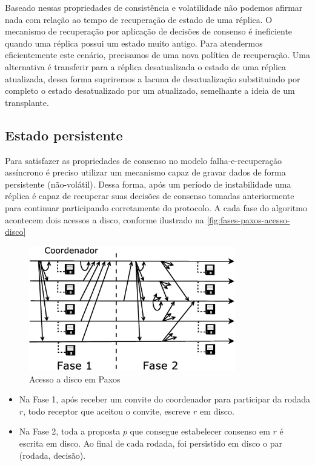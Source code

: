 Baseado nessas propriedades de consistência e volatilidade não podemos afirmar nada com
relação ao tempo de recuperação de estado de uma réplica. O mecanismo de recuperação por
aplicação de decisões de consenso é ineficiente quando uma réplica possui um estado muito
antigo. Para atendermos eficientemente este cenário, precisamos de uma nova política de
recuperação. Uma alternativa é transferir para a réplica desatualizada o estado de uma
réplica atualizada, dessa forma supriremos a lacuna de desatualização substituindo por
completo o estado desatualizado por um atualizado, semelhante a ideia de um transplante.

\subsection{Estado persistente}

Para satisfazer as propriedades de consenso no modelo falha-e-recuperação assíncrono é
preciso utilizar um mecanismo capaz de gravar dados de forma persistente (não-volátil).
Dessa forma, após um período de instabilidade uma réplica é capaz de recuperar suas
decisões de consenso tomadas anteriormente para continuar participando corretamente do
protocolo. A cada fase do algoritmo acontecem dois acessos a disco, conforme ilustrado na
\autoref{fig:fases-paxos-acesso-disco}

\begin{figure}[htbp]
  \centering
  \includegraphics[width=9cm]{conteudo/capitulos/figuras/fases-paxos-acesso-disco.eps}
  \caption{Acesso a disco em Paxos}
  \label{fig:fases-paxos-acesso-disco}
\end{figure}

\begin{itemize}
  \item Na Fase 1, após receber um convite do coordenador para participar da rodada $r$,
    todo receptor que aceitou o convite, escreve $r$ em disco.
  \item Na Fase 2, toda a proposta $p$ que consegue estabelecer consenso em $r$ é
    escrita em disco. Ao final de cada rodada, foi persistido em disco o par (rodada,
    decisão).
\end{itemize}

